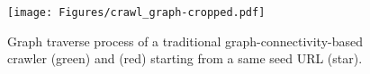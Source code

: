 \begin{figure}[t]
    \centering
    \texttt{[image: Figures/crawl\_graph-cropped.pdf]}
    \caption{Graph traverse process of a traditional graph-connectivity-based crawler (green) and \ours{} (red) starting from a same seed URL (star). 
    }
    \label{fig:graph_traverse}
\end{figure}